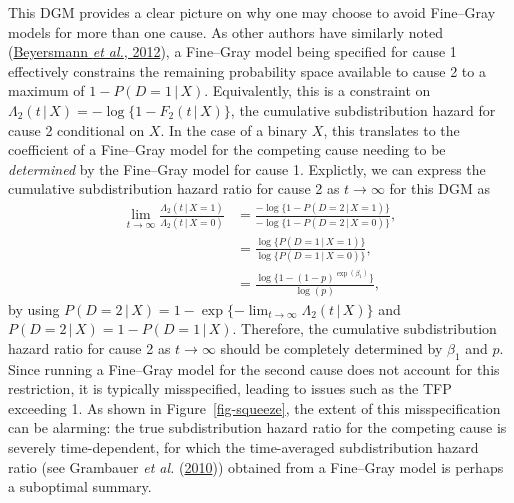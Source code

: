 \documentclass[
  letterpaper,
  DIV=11,
  numbers=noendperiod]{scrreprt}
\newcommand{\given}{\,|\,}
\begin{document}
This DGM provides a clear picture on why one may choose to avoid
Fine--Gray models for more than one cause. As other authors have
similarly noted
(\protect\hyperlink{ref-beyersmannCompetingRisksMultistate2012}{Beyersmann
\emph{et al.}, 2012}), a Fine--Gray model being specified for cause 1
effectively constrains the remaining probability space available to
cause 2 to a maximum of \(1 - P(D = 1 \given X)\). Equivalently, this is
a constraint on
\(\Lambda_2(t \given X) = -\log\{1 - F_2(t \given X)\}\), the cumulative
subdistribution hazard for cause 2 conditional on \(X\). In the case of
a binary \(X\), this translates to the coefficient of a Fine--Gray model
for the competing cause needing to be \textit{determined} by the
Fine--Gray model for cause 1. Explictly, we can express the cumulative
subdistribution hazard ratio for cause 2 as \(t \to \infty\) for this
DGM as \begin{align*}
    \lim_{t \to \infty} \frac{\Lambda_{2}(t \given X = 1)}{\Lambda_{2}(t \given X = 0)} &= \frac{-\log\{1 - P(D = 2 \given X = 1)\}}{-\log\{1 - P(D = 2 \given X = 0)\}} ,\\
    &= \frac{\log \{P(D = 1 \given X = 1)\}}{\log \{P(D = 1 \given X = 0)\}}, \\
    &= \frac{\log \{1 - (1-p)^{\exp(\beta_1)}\}}{\log(p)},
\end{align*} by using
\(P(D = 2 \given X) = 1 - \exp\{- \lim_{t \to \infty} \Lambda_2(t \given X)\}\)
and \(P(D = 2 \given X) = 1 - P(D = 1 \given X)\). Therefore, the
cumulative subdistribution hazard ratio for cause 2 as \(t \to \infty\)
should be completely determined by \(\beta_1\) and \(p\). Since running
a Fine--Gray model for the second cause does not account for this
restriction, it is typically misspecified, leading to issues such as the
TFP exceeding 1. As shown in Figure~\ref{fig-squeeze}, the extent of
this misspecification can be alarming: the true subdistribution hazard
ratio for the competing cause is severely time-dependent, for which the
time-averaged subdistribution hazard ratio (see Grambauer \emph{et al.}
(\protect\hyperlink{ref-grambauerProportionalSubdistributionHazards2010}{2010}))
obtained from a Fine--Gray model is perhaps a suboptimal summary.
\end{document}
